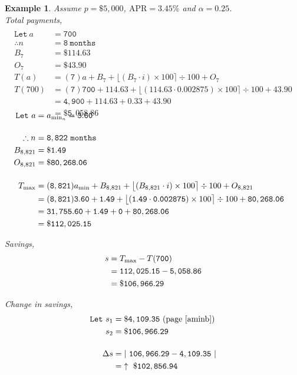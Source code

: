 \documentclass[12pt,letterpaper,oneside]{article}
\newtheorem{example}{Example}[section]
\theoremstyle{remark} %
\begin{document}
	\newpage
	\begin{example}
	Assume $p=\$5,000$, $\mbox{APR}=3.45\%$ and $\alpha=0.25$.\\[12pt]
	Total payments,
	\begin{align*}
	\\\mathtt{Let\ } a&=\mathtt{700}\\[12pt]
	\therefore n&=\mathtt{8\ months}\\
	B_{7}&=\mathtt{\$114.63}\\
	O_{7}&=\mathtt{\$43.90}\\[12pt]		
	T(a)&=(\mathtt{7}) a+B_{7}+\big\lfloor{\left(B_{7}\cdot i\right)\times 100}\big\rceil\div 100+O_{7}\\
	T(700)&=(\mathtt{7}) \mathtt{700}+\mathtt{114.63}+\big\lfloor{\left(\mathtt{114.63}\cdot \mathtt{0.002875}\right)\times 100}\big\rceil\div 100+\mathtt{43.90}\\
	&=\mathtt{4,900}+\mathtt{114.63}+\mathtt{0.33}+\mathtt{43.90}\\
	&=\mathtt{\$5,058.86}
	\end{align*}

	\label{aminc}
	\begin{align*}\\[-36pt]
	\mathtt{Let\ } a&=a_{\rm{min_{\mathnormal{n}}}}=\mathtt{3.60}\\[12pt]
	\therefore n&=\mathtt{8,822\ months}\\
	B_{8,821}&=\mathtt{\$1.49}\\
	O_{8,821}&=\mathtt{\$80,268.06}\\[12pt]		
	T_{\rm{max}}&=(\mathtt{8,821}) a_{\rm{min}}+B_{8,821}+\big\lfloor{\left(B_{8,821}\cdot i\right)\times 100}\big\rceil\div 100+O_{8,821}\\
	&=(\mathtt{8,821}) \mathtt{3.60}+\mathtt{1.49}+\big\lfloor{\left(\mathtt{1.49}\cdot \mathtt{0.002875}\right)\times 100}\big\rceil\div 100+\mathtt{80,268.06}\\
	&=\mathtt{31,755.60}+\mathtt{1.49}+\mathtt{0}+\mathtt{80,268.06}\\
	&=\mathtt{\$112,025.15}
	\end{align*}

	\vspace{12pt}
	Savings,
	\begin{align*}
	s&=T_{\rm{max}}-T(\mathtt{700})\\
	&=\mathtt{112,025.15}-\mathtt{5,058.86}\\
	&=\mathtt{\$106,966.29}
	\end{align*}

	Change in savings,
	\begin{align*}
	\mathtt{Let\ }s_{1}&=\mathtt{\$4,109.35}\ \mbox{(page\ \pageref{aminb})}\\
	s_{2}&=\mathtt{\$106,966.29}\\[12pt]
	\Delta s&=\left|\ \mathtt{106,966.29}-\mathtt{4,109.35}\ \right|\\
	&=\mathtt{\uparrow\ \$102,856.94}
	\end{align*}	
	\end{example}
\end{document}
